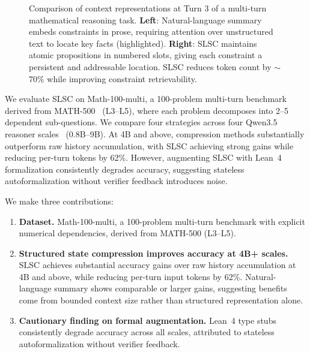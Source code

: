 \begin{figure}[!t]
\caption{Comparison of context representations at Turn 3 of a multi-turn mathematical reasoning task. \textbf{Left}: Natural-language summary embeds constraints in prose, requiring attention over unstructured text to locate key facts (highlighted). \textbf{Right}: SLSC maintains atomic propositions in numbered slots, giving each constraint a persistent and addressable location. SLSC reduces token count by $\sim$70\% while improving constraint retrievability.}
\label{fig:comparison}
\end{figure}

We evaluate SLSC on Math-100-multi, a 100-problem multi-turn benchmark derived from MATH-500~\citep{lightman2023math500,cobbe2021gsm8k} (L3--L5), where each problem decomposes into 2--5 dependent sub-questions. We compare four strategies across four Qwen3.5 reasoner scales~\citep{qwen3.5} (0.8B--9B). At 4B and above, compression methods substantially outperform raw history accumulation, with SLSC achieving strong gains while reducing per-turn tokens by 62\%. However, augmenting SLSC with Lean~4 formalization consistently degrades accuracy, suggesting stateless autoformalization without verifier feedback introduces noise.

We make three contributions:
\begin{enumerate}[noitemsep, topsep=2pt]
    \item \textbf{Dataset.} Math-100-multi, a 100-problem multi-turn benchmark with explicit numerical dependencies, derived from MATH-500 (L3--L5).

    \item \textbf{Structured state compression improves accuracy at 4B+ scales.} SLSC achieves substantial accuracy gains over raw history accumulation at 4B and above, while reducing per-turn input tokens by 62\%. Natural-language summary shows comparable or larger gains, suggesting benefits come from bounded context size rather than structured representation alone.

    \item \textbf{Cautionary finding on formal augmentation.} Lean~4 type stubs consistently degrade accuracy across all scales, attributed to stateless autoformalization without verifier feedback.
\end{enumerate}